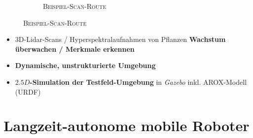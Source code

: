 \documentclass{beamer}
\begin{document}
\begin{frame}
\begin{figure}[H]
\begin{subfigure}[b]{0.49\textwidth}
      \caption*{\textsc{Beispiel-Scan-Route}}
    \end{subfigure}
  \end{figure}
  \begin{itemize}
    \item 3D-Lidar-Scans / Hyperspektralaufnahmen von Pflanzen \textrightarrow \thinspace \textbf{Wachstum überwachen / Merkmale erkennen}
    \item \textbf{Dynamische, unstrukturierte Umgebung}
    \item \textbf{$2.5D$-Simulation der Testfeld-Umgebung} in \textit{Gazebo} inkl. AROX-Modell (URDF)
  \end{itemize}
\end{frame}

\section{Langzeit-autonome mobile Roboter}
\end{document}
